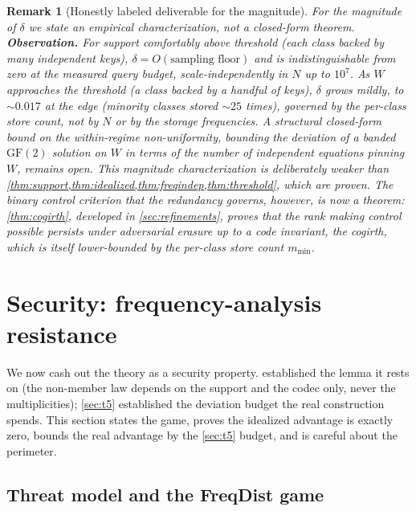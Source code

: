 \documentclass[acmsmall,review]{acmart}
\newtheorem{remark}{Remark}
\newcommand{\GF}{\mathrm{GF}(2)}
\newcommand{\W}{W}                          %
\begin{document}
\begin{remark}[Honestly labeled deliverable for the magnitude]
\label{rem:t5-bound}
For the \emph{magnitude} of $\delta$ we state an empirical characterization, not a
closed-form theorem. \textbf{Observation.} For support comfortably above threshold (each
class backed by many independent keys), $\delta = O(\text{sampling floor})$ and is
indistinguishable from zero at the measured query budget, scale-independently in $N$ up to
$10^7$. As $\W$ approaches the threshold (a class backed by a handful of keys), $\delta$
grows mildly, to $\sim 0.017$ at the edge (minority classes stored $\sim 25$ times),
governed by the per-class store count, not by $N$ or by the storage frequencies. A
structural closed-form bound on the within-regime non-uniformity, bounding the deviation of
a banded $\GF$ solution on $\W$ in terms of the number of independent equations pinning
$\W$, remains open. This magnitude characterization is deliberately weaker than
\cref{thm:support,thm:idealized,thm:freqindep,thm:threshold}, which are proven. The
\emph{binary control criterion} that the redundancy governs, however, is now a theorem:
\cref{thm:cogirth}, developed in \cref{sec:refinements}, proves that the rank making control possible persists under
adversarial erasure up to a code invariant, the cogirth, which is itself lower-bounded by
the per-class store count $m_{\min}$.
\end{remark}

\section{Security: frequency-analysis resistance}
\label{sec:security}

We now cash out the theory as a security property.  established the
lemma it rests on (the non-member law depends on the support and the codec only, never
the multiplicities); \cref{sec:t5} established the deviation budget the real construction
spends. This section states the game, proves the idealized advantage is exactly zero,
bounds the real advantage by the \cref{sec:t5} budget, and is careful about the
perimeter.

\subsection{Threat model and the FreqDist game}
\end{document}
